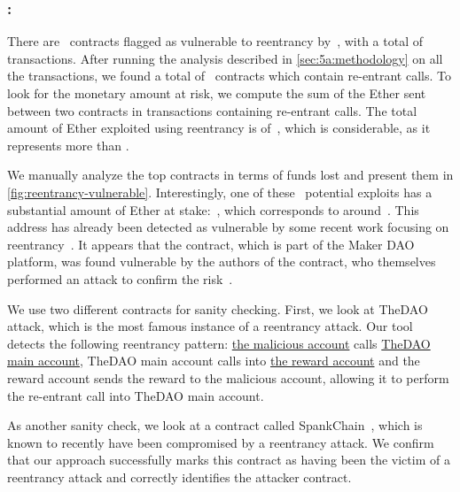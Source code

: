 \subsubsection{\vre: \reentrancy}
\label{ssec:analysis-re}
There are~ contracts flagged as vulnerable to reentrancy by~\cite{Luu2016a,Tsankov2018,DBLP:conf/ndss/KalraGDS18}, with a total of~ transactions. After running the analysis described in \autoref{sec:5a:methodology} on all the transactions, we found a total of~ contracts which contain re-entrant calls. To look for the monetary amount at risk, we compute the sum of the Ether sent between two contracts in transactions containing re-entrant calls. The total amount of Ether exploited using reentrancy is of~, which is considerable, as it represents more than .

We manually analyze the top contracts in terms of funds lost and present them in \autoref{fig:reentrancy-vulnerable}. Interestingly, one of these~ potential exploits has a substantial amount of Ether at stake:~, which corresponds to around~. This address has already been detected as vulnerable by some recent work focusing on reentrancy~\cite{Rodler2019}. It appears that the contract, which is part of the Maker DAO~\cite{maker-dao} platform, was found vulnerable by the authors of the contract, who themselves performed an attack to confirm the risk~\cite{ds-eth-token}.

We use two different contracts for sanity checking.
First, we look at TheDAO attack, which is the most famous instance of a reentrancy attack. Our tool detects the following reentrancy pattern: \href{https://etherscan.io/address/0xc0ee9db1a9e07ca63e4ff0d5fb6f86bf68d47b89}{the malicious account} calls \href{https://etherscan.io/address/0xbb9bc244d798123fde783fcc1c72d3bb8c189413}{TheDAO main account}, TheDAO main account calls into \href{https://etherscan.io/address/0xd2e16a20dd7b1ae54fb0312209784478d069c7b0}{the reward account} and the reward account sends the reward to the malicious account, allowing it to perform the re-entrant call into TheDAO main account.

As another sanity check, we look at a contract called SpankChain~\cite{spank-chain}, which is known to recently have been compromised by a reentrancy attack. We confirm that our approach successfully marks this contract as having been the victim of a reentrancy attack and correctly identifies the attacker contract.

